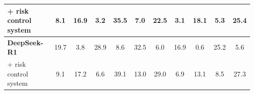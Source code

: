 \begin{table}[h]
\begin{tabular}{l|cc|cc|cc|cc|cc}
        + risk control system           & 8.1                  & 16.9               & 3.2               & 35.5             & 7.0               & 22.5             & 3.1               & 18.1             & 5.3               & 25.4             \\ \midrule
        \textbf{DeepSeek-R1}            & 19.7                 & 3.8                & 28.9              & 8.6              & 32.5              & 6.0              & 16.9              & 0.6              & 25.2              & 5.6              \\
        + risk control system           & 9.1                  & 17.2               & 6.6               & 39.1             & 13.0              & 29.0             & 6.9               & 13.1             & 8.5               & 27.3              \\
        \bottomrule
    \end{tabular}
\end{table}